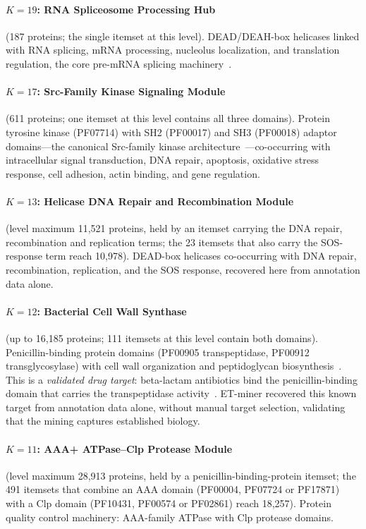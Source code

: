 \documentclass[10pt,a4paper,twocolumn]{article}
\begin{document}
\paragraph{$K{=}19$: RNA Spliceosome Processing Hub} (187 proteins; the single itemset at this level). DEAD/DEAH-box helicases linked with RNA splicing, mRNA processing, nucleolus localization, and translation regulation, the core pre-mRNA splicing machinery~\cite{wahl2009}.

\paragraph{$K{=}17$: Src-Family Kinase Signaling Module}
(611 proteins; one itemset at this level contains all three domains). Protein tyrosine kinase (PF07714) with SH2 (PF00017)
and SH3 (PF00018) adaptor domains---the canonical Src-family kinase
architecture~\cite{boggon2004}---co-occurring with intracellular signal transduction, DNA repair,
apoptosis, oxidative stress response, cell adhesion, actin binding, and gene
regulation.

\paragraph{$K{=}13$: Helicase DNA Repair and Recombination Module} (level maximum 11,521 proteins, held by an itemset carrying the DNA repair, recombination and replication terms; the 23 itemsets that also carry the SOS-response term reach 10,978). DEAD-box helicases co-occurring with DNA repair, recombination, replication, and the SOS response, recovered here from annotation data alone.

\paragraph{$K{=}12$: Bacterial Cell Wall Synthase} (up to 16,185 proteins; 111 itemsets at this level contain both domains). Penicillin-binding protein domains (PF00905 transpeptidase, PF00912 transglycosylase) with cell wall organization and peptidoglycan biosynthesis~\cite{sauvage2008}. This is a \emph{validated drug target}: beta-lactam antibiotics bind the penicillin-binding domain that carries the transpeptidase activity~\cite{sauvage2008}. ET-miner recovered this known target from annotation data alone, without manual target selection, validating that the mining captures established biology.

\paragraph{$K{=}11$: AAA+ ATPase--Clp Protease Module} (level maximum 28,913 proteins, held by a penicillin-binding-protein itemset; the 491 itemsets that combine an AAA domain (PF00004, PF07724 or PF17871) with a Clp domain (PF10431, PF00574 or PF02861) reach 18,257). Protein quality control machinery: AAA-family ATPase with Clp protease domains.
\end{document}
